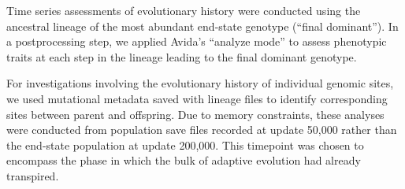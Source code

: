 Time series assessments of evolutionary history were conducted using the ancestral lineage of the most abundant end-state genotype (``final dominant'').
In a postprocessing step, we applied Avida's ``analyze mode'' to assess phenotypic traits at each step in the lineage leading to the final dominant genotype.

For investigations involving the evolutionary history of individual genomic sites, we used mutational metadata saved with lineage files to identify corresponding sites between parent and offspring.
Due to memory constraints, these analyses were conducted from population save files recorded at update 50,000 rather than the end-state population at update 200,000.
This timepoint was chosen to encompass the phase in which the bulk of adaptive evolution had already transpired.

